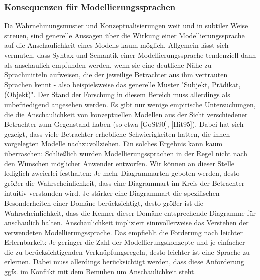 \subsubsection{Konsequenzen für Modellierungssprachen} 
Da Wahrnehmungsmuster und Konzeptualisierungen weit und in subtiler Weise streuen, sind generelle
Aussagen über die Wirkung einer Modellierungssprache auf die Anschaulichkeit eines Modells kaum
möglich. Allgemein lässt sich vermuten, dass Syntax und Semantik einer Modellierungssprache tendenziell
dann als anschaulich empfunden werden, wenn sie eine deutliche Nähe zu Sprachmitteln aufweisen,
die der jeweilige Betrachter aus ihm vertrauten Sprachen kennt - also beispielsweise das generelle
Muster "Subjekt, Prädikat, (Objekt)". Der Stand der Forschung in diesem Bereich muss allerdings als
unbefriedigend angesehen werden. Es gibt nur wenige empirische Untersuchungen, die die Anschaulichkeit
von konzeptuellen Modellen aus der Sicht verschiedener Betrachter zum Gegenstand haben (so
etwa [GoSt90], [Hit95]). Dabei hat sich gezeigt, dass viele Betrachter erhebliche Schwierigkeiten hatten,
die ihnen vorgelegten Modelle nachzuvollziehen. Ein solches Ergebnis kann kaum überraschen:
Schließlich wurden Modellierungssprachen in der Regel nicht nach den Wünschen möglicher Anwender entworfen.
Wir können an dieser Stelle lediglich zweierlei festhalten: Je mehr Diagrammarten geboten
werden, desto größer die Wahrscheinlichkeit, dass eine Diagrammart im Kreis der Betrachter intuitiv
verstanden wird. Je stärker eine Diagrammart die spezifischen Besonderheiten einer Domäne berücksichtigt,
desto größer ist die Wahrscheinlichkeit, dass die Kenner dieser Domäne entsprechende Diagramme
für anschaulich halten. Anschaulichkeit impliziert sinnvollerweise das Verstehen der verwendeten
Modellierungssprache. Das empfiehlt die Forderung nach leichter Erlernbarkeit: Je geringer die
Zahl der Modellierungskonzepte und je einfacher die zu berücksichtigenden Verknüpfungsregeln,
desto leichter ist eine Sprache zu erlernen. Dabei muss allerdings berücksichtigt werden, dass diese
Anforderung ggfs. im Konflikt mit dem Bemühen um Anschaulichkeit steht.\\
